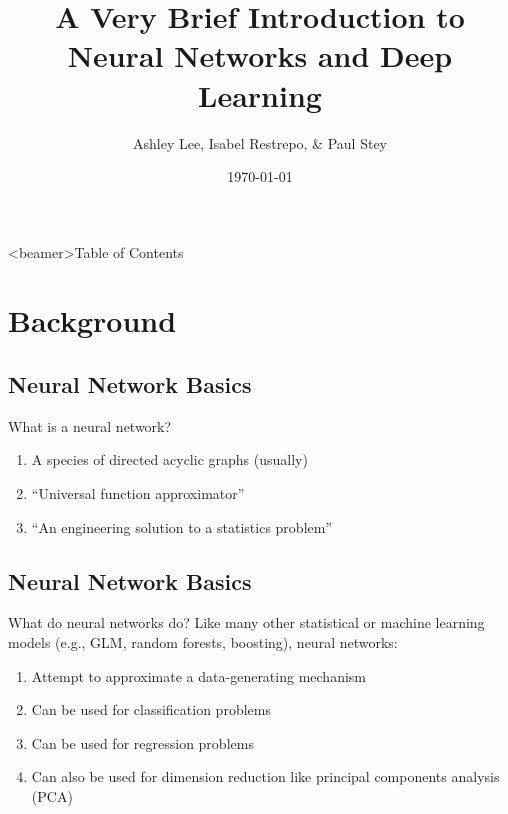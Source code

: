 \documentclass[pdf]{beamer}
\title[Intro to Deep Learning]{A Very Brief Introduction to Neural Networks and Deep Learning}
\author{Ashley Lee, Isabel Restrepo, \& Paul Stey}
\date{\today}
\begin{document}
\begin{frame}
\titlepage
\end{frame}



\begin{frame}<beamer>{Table of Contents}
	\tableofcontents[currentsection, 
				 currentsubsection, 
				 sectionstyle=show, 
				 subsectionstyle=show]
\end{frame}

\section{Background}

\subsection{Neural Network Basics}
	\begin{frame}{What is a neural network?}
		\begin{enumerate}
			\item A species of directed acyclic graphs (usually)
			\item ``Universal function approximator''
			\item ``An engineering solution to a statistics problem''
		\end{enumerate}
	\end{frame}
	
\subsection{Neural Network Basics}
	\begin{frame}{What do neural networks do?}
	Like many other statistical or machine learning models (e.g., GLM, random forests, boosting), neural networks:
	
	\vspace{1em}
	
		\begin{enumerate}
			\item Attempt to approximate a data-generating mechanism
			\item Can be used for classification problems
			\item Can be used for regression problems
			\item Can also be used for dimension reduction like principal components analysis (PCA)
 
		\end{enumerate}
	\end{frame}
\end{document}
